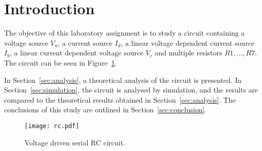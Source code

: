 \section{Introduction}
\label{sec:introduction}

The objective of this laboratory assignment is to study a circuit containing a voltage source $V_a$, a current source $I_d$, 
a linear voltage dependent current source $I_b$, a linear current dependent voltage source $V_c$ and multiple resistors $R1,...,R7$.
The circuit can be seen in Figure~\ref{fig:rc}.


In Section~\ref{sec:analysis}, a theoretical analysis of the circuit is
presented. In Section~\ref{sec:simulation}, the circuit is analysed by
simulation, and the results are compared to the theoretical results obtained in
Section~\ref{sec:analysis}. The conclusions of this study are outlined in
Section~\ref{sec:conclusion}.

\begin{figure}[h] \centering
\texttt{[image: rc.pdf]}
\caption{Voltage driven serial RC circuit.}
\label{fig:rc}
\end{figure}


